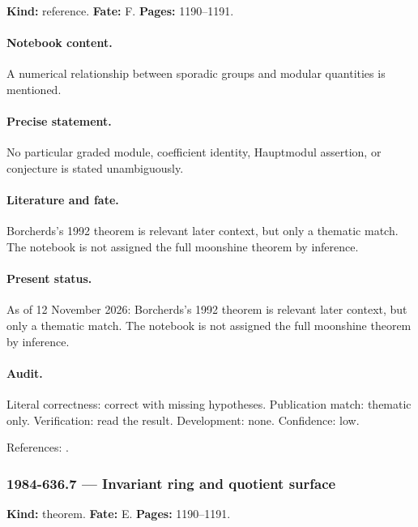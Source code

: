 \label{item:1984-636.6}

\noindent\textbf{Kind:} reference. \textbf{Fate:} F. \textbf{Pages:} 1190--1191.\par

\paragraph{Notebook content.} A numerical relationship between sporadic groups and modular quantities is mentioned.

\paragraph{Precise statement.} No particular graded module, coefficient identity, Hauptmodul assertion, or conjecture is stated unambiguously.

\paragraph{Literature and fate.} Borcherds's 1992 theorem is relevant later context, but only a thematic match. The notebook is not assigned the full moonshine theorem by inference.

\paragraph{Present status.} As of 12 November 2026: Borcherds's 1992 theorem is relevant later context, but only a thematic match. The notebook is not assigned the full moonshine theorem by inference.

\paragraph{Audit.} Literal correctness: correct with missing hypotheses. Publication match: thematic only. Verification: read the result. Development: none. Confidence: low.

\noindent References: \citep{borcherds1992moonshine}.\par

\subsubsection{1984-636.7 --- Invariant ring and quotient surface}

\label{item:1984-636.7}

\noindent\textbf{Kind:} theorem. \textbf{Fate:} E. \textbf{Pages:} 1190--1191.\par


